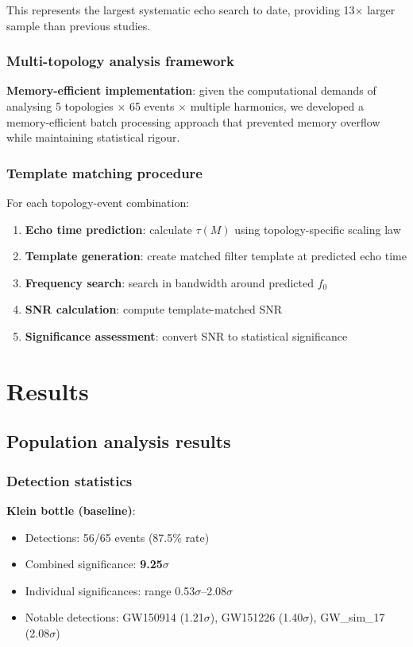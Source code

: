 \documentclass[12pt]{article}
\begin{document}
This represents the largest systematic echo search to date, providing 13$\times$ larger sample than previous studies.

\subsubsection{Multi-topology analysis framework}

\textbf{Memory-efficient implementation}: given the computational demands of analysing 5 topologies $\times$ 65 events $\times$ multiple harmonics, we developed a memory-efficient batch processing approach that prevented memory overflow while maintaining statistical rigour.

\subsubsection{Template matching procedure}

For each topology-event combination:
\begin{enumerate}
\item \textbf{Echo time prediction}: calculate $\tau(M)$ using topology-specific scaling law
\item \textbf{Template generation}: create matched filter template at predicted echo time
\item \textbf{Frequency search}: search in bandwidth around predicted $f_0$
\item \textbf{SNR calculation}: compute template-matched SNR
\item \textbf{Significance assessment}: convert SNR to statistical significance
\end{enumerate}

\section{Results}

\subsection{Population analysis results}

\subsubsection{Detection statistics}

\textbf{Klein bottle (baseline)}:
\begin{itemize}
\item Detections: 56/65 events (87.5\% rate)
\item Combined significance: \textbf{9.25$\sigma$}
\item Individual significances: range 0.53$\sigma$--2.08$\sigma$
\item Notable detections: GW150914 (1.21$\sigma$), GW151226 (1.40$\sigma$), GW\_sim\_17 (2.08$\sigma$)
\end{itemize}
\end{document}
